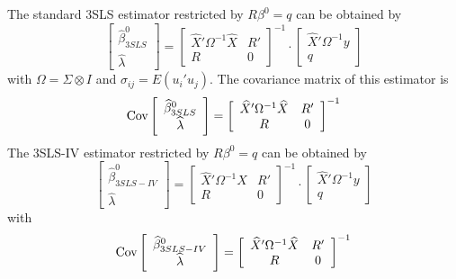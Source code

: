 The standard 3SLS estimator restricted by $R \beta^0 = q$ can be obtained by
\begin{equation}
   \left[ \begin{array}{c}
      \widehat{\beta}^0_{3SLS} \\ \widehat{\lambda}
   \end{array} \right]
   =
   \left[ \begin{array}{cc}
      \widehat{X}' \Omega^{-1} \widehat{X} & R' \\ 
      R & 0
   \end{array} \right]^{-1}
   \cdot
   \left[ \begin{array}{c}
      \widehat{X}' \Omega^{-1} y \\ q 
   \end{array} \right]
   \label{eq:3slsGlsR}
\end{equation}
with $\Omega = \Sigma \otimes I$ and
$\sigma_{ij} = E \left( u_i' u_j \right)$.
The covariance matrix of this estimator is
\begin{equation}
   \text{Cov} 
   \left[ \begin{array}{c}
      \widehat{\beta}^0_{3SLS} \\ \widehat{\lambda}
   \end{array} \right] 
   = 
   \left[ \begin{array}{cc}
      \widehat{X}' \Omega^{-1} \widehat{X} & R' \\ 
      R & 0
   \end{array} \right]^{-1}
   \label{eq:cov3slsr}
\end{equation}
The 3SLS-IV estimator restricted by $R \beta^0 = q$ can be obtained by
\begin{equation}
   \left[ \begin{array}{c}
      \widehat{\beta}^0_{3SLS-IV} \\ \widehat{\lambda}
   \end{array} \right]
   =
   \left[ \begin{array}{cc}
      \widehat{X}' \Omega^{-1} X & R' \\ 
      R & 0
   \end{array} \right]^{-1}
   \cdot
   \left[ \begin{array}{c}
      \widehat{X}' \Omega^{-1} y \\ q 
   \end{array} \right]
   \label{eq:3slsIvR}
\end{equation}
with
\begin{equation}
   \text{Cov} 
   \left[ \begin{array}{c}
      \widehat{\beta}^0_{3SLS-IV} \\ \widehat{\lambda}
   \end{array} \right] 
   = 
   \left[ \begin{array}{cc}
      \widehat{X}' \Omega^{-1} \widehat{X} & R' \\ 
      R & 0
   \end{array} \right]^{-1}
\end{equation}
